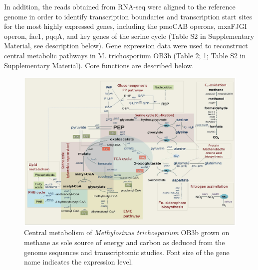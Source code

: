 In addition, the reads obtained from RNA-seq were aligned to the reference genome in order to identify transcription boundaries and transcription start sites for the most highly expressed genes, including the pmoCAB operons, mxaFJGI operon, fae1, pqqA, and key genes of the serine cycle (Table S2 in Supplementary Material, see description below).
Gene expression data were used to reconstruct central metabolic pathways in M. trichosporium OB3b (Table 2; \ref{fig:A_metabolic_map}; Table S2 in Supplementary Material).
Core functions are described below.


\begin{figure}[H]
\centering
     \includegraphics[width=1.0\textwidth]{./tex/chapter1/figures/figure1.png}
     \begin{singlespace}
     \caption[Central metabolism of \textit{Methylosinus trichosporium} OB3b]{
        Central metabolism of \textit{Methylosinus trichosporium} OB3b grown on methane as sole source of energy and carbon as
        deduced from the genome sequences and transcriptomic studies.
        Font size of the gene name indicates the expression level.}
     \label{fig:A_metabolic_map}
     \end{singlespace}
\end{figure}

